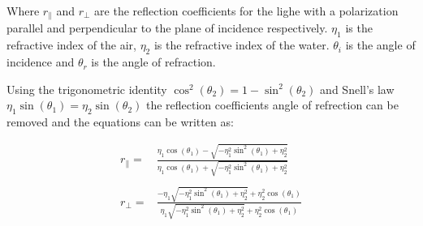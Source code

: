 Where $r_\parallel$ and $r_\perp$ are the reflection coefficients for the lighe with a polarization parallel and perpendicular to the plane of incidence respectively.
$\eta_1$ is the refractive index of the air, $\eta_2$ is the refractive index of the water.
$\theta_i$ is the angle of incidence and $\theta_r$ is the angle of refraction.

Using the trigonometric identity $ \cos^2{\left(\theta_2 \right)} = 1- \sin^2{\left(\theta_2 \right)}$ and Snell's law $\eta_1 \sin{\left(\theta_1 \right)} = \eta_2 \sin{\left(\theta_2 \right)}$ the reflection coefficients angle of refrection can be removed and the equations can be written as:

\begin{align}
    r_\parallel = & \frac{\eta_1 \cos{\left(\theta_1 \right)} - \sqrt{- \eta_1^{2} \sin^{2}{\left(\theta_1 \right)} + \eta_2^{2}}}
    {\eta_1 \cos{\left(\theta_1 \right)} + \sqrt{- \eta_1^{2} \sin^{2}{\left(\theta_1 \right)} + \eta_2^{2}}}                                   \\
    \\
    r_\perp     = & \frac{- \eta_1 \sqrt{- \eta_1^{2} \sin^{2}{\left(\theta_1 \right)} + \eta_2^{2}} + \eta_2^{2} \cos{\left(\theta_1 \right)}}
    {\eta_1 \sqrt{- \eta_1^{2} \sin^{2}{\left(\theta_1 \right)} + \eta_2^{2}} + \eta_2^{2} \cos{\left(\theta_1 \right)}}
\end{align}


